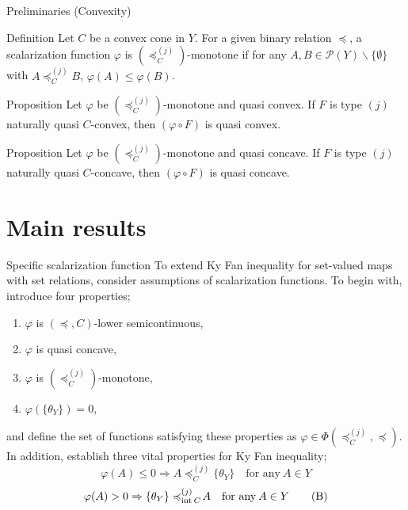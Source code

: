 \documentclass[aspectratio=169, dvipdfmx, 11pt]{beamer}
\newcommand{\Interior}[1]{\text{\rm int\:${#1}$}} %
\newcommand{\setrel}[2]{\preccurlyeq^{(#1)}_{#2}\!}
\begin{document}
\begin{frame}{Preliminaries (Convexity)}
  \begin{block}{Definition}
    Let $C$ be a convex cone in $Y$.
    For a given binary relation $\preccurlyeq$,
    a scalarization function $\varphi$ is $(\setrel{j}{C})$-monotone if
    for any $A, B \in \mathcal{P}(Y) \backslash \{\emptyset\}$ with
    $A \setrel{j}{C} B$, $\varphi (A) \leq \varphi (B)$.
  \end{block}

  \begin{block}{Proposition}
    Let $\varphi$ be $(\setrel{j}{C})$-monotone and quasi convex.
    If $F$ is type $(j)$ naturally quasi $C$-convex,
    then $(\varphi \circ F)$ is quasi convex.
  \end{block}

  \begin{block}{Proposition}
    Let $\varphi$ be $(\setrel{j}{C})$-monotone and quasi concave.
    If $F$ is type $(j)$ naturally quasi $C$-concave,
    then $(\varphi \circ F)$ is quasi concave.
  \end{block}
\end{frame}

\section{Main results}

\begin{frame}{Specific scalarization function}
  To extend Ky Fan inequality for set-valued maps with set relations,
  consider assumptions of scalarization functions.
  To begin with, introduce four properties;
  \begin{enumerate}
    \item $\varphi$ is $(\preccurlyeq, C)$-lower semicontinuous,
    \item $\varphi$ is quasi concave,
    \item $\varphi$ is $(\setrel{j}{C})$-monotone,
    \item $\varphi(\{\theta_{Y}\}) = 0$,
  \end{enumerate}
  and define the set of functions satisfying these properties as $\varphi \in \Phi(\setrel{j}{C}, \preccurlyeq)$.
  In addition, establish three vital properties for Ky Fan inequality;
  \begin{equation}
    \varphi (A) \leq 0 \Rightarrow  A \setrel{j}{C} \{\theta_Y\}\quad\text{for any}\:A\in Y \tag*{(A)}
  \end{equation}
  \begin{equation}
    \varphi (A) > 0 \Rightarrow  \{\theta_Y\} \setrel{j}{\Interior{C}} A \quad\text{for any}\:A\in Y \tag*{(B)}
  \end{equation}
\end{frame}
\end{document}
